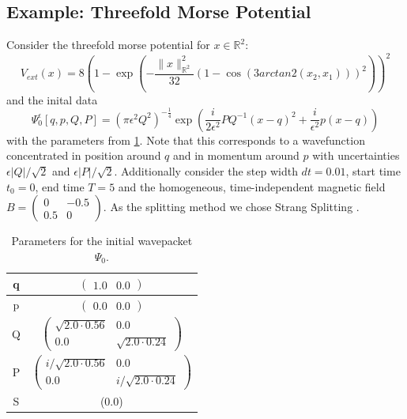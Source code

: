 \documentclass[11pt, a4paper, oneside]{article}
\begin{document}
\subsection{Example: Threefold Morse Potential}
Consider the threefold morse potential for $x \in \mathbb{R}^2$:
\begin{equation*}
  V_{ext}(x) = 8 \left(1 - \exp\left( - \frac{\lVert x \rVert _{\mathbb{R}^2}^2}{32}(1 - \cos(3arctan2(x_2, x_1)))^2\right)\right)^2
\end{equation*}
and the inital data
\begin{equation*}
  \Psi_0^{\epsilon}[q, p, Q, P] = \left( \pi \epsilon^2 Q^2 \right)^{-\frac{1}{4}} \exp \left( \frac{i}{2\epsilon^2} PQ^{-1}(x-q)^2 + \frac{i}{\epsilon^2}p(x-q) \right)
\end{equation*}
 with the parameters from \cref{tab:params}. Note that this corresponds to a wavefunction concentrated in position around $q$ and in momentum around $p$ with uncertainties $\epsilon \lvert Q \rvert / \sqrt{2}$ and $\epsilon \lvert P \rvert / \sqrt{2}$. Additionally consider the step width $dt=0.01$, start time $t_0=0$, end time $T=5$ and the homogeneous, time-independent magnetic field $B = \begin{pmatrix} 0 & -0.5 \\ 0.5 & 0 \end{pmatrix}$. As the splitting method we chose Strang Splitting .
\begin{table}[h]
  \centering
  \begin{tabular}{c|c}
    q & $\begin{pmatrix}1.0 & 0.0 \end{pmatrix}$ \\ \hline
    p & $\begin{pmatrix}0.0 & 0.0 \end{pmatrix}$ \\ \hline
    Q & $\begin{pmatrix}
      \sqrt{2.0 \cdot 0.56} & 0.0 \\
      0.0 & \sqrt{2.0 \cdot 0.24}
    \end{pmatrix}$ \\ \hline
    P & $\begin{pmatrix}
      i/\sqrt{2.0 \cdot 0.56} & 0.0 \\
      0.0 & i/\sqrt{2.0 \cdot 0.24}
    \end{pmatrix}$ \\ \hline
    S & (0.0) \\
  \end{tabular}
  \caption{Parameters for the initial wavepacket $\Psi_0$.}
  \label{tab:params}

\end{table}
\end{document}
